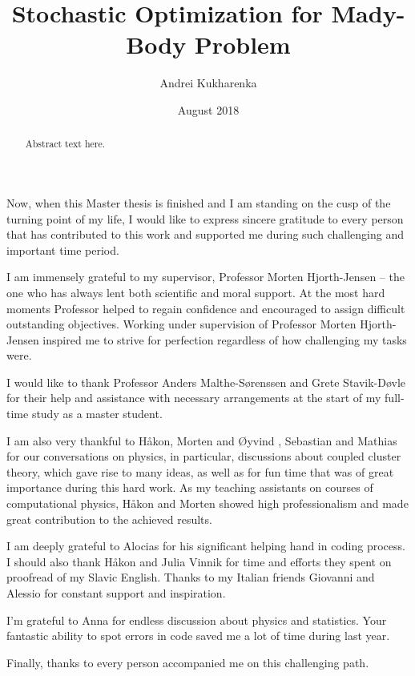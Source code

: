 \documentclass[twoside,english]{uiofysmaster}
\author{Andrei Kukharenka}
\title{Stochastic Optimization for Mady-Body Problem}
\date{August 2018}
\begin{document}
	
	\maketitle
	
	\begin{abstract}
		Abstract text here.
	\end{abstract}
	
	
	\begin{acknowledgements}
		Now, when this Master thesis is finished and I am standing on the cusp of the turning point of my life, I would like to express sincere gratitude to every person that has contributed to this work and supported me during such challenging and important time period.
		
		I am immensely grateful to my supervisor, Professor Morten Hjorth-Jensen -- the one who has always lent both scientific and moral support. At the most hard moments Professor helped to regain confidence and encouraged to assign difficult outstanding objectives. Working under supervision of Professor Morten Hjorth-Jensen inspired me to strive for perfection regardless of how challenging my tasks were.
		
		I would like to thank Professor Anders Malthe-S\o renssen and Grete Stavik-D\o vle for their help and assistance with necessary arrangements at the start of my full-time study as a master student.
		
		I am also very thankful to H\aa kon, Morten and \O yvind , Sebastian and Mathias for our conversations on physics, in particular, discussions about coupled cluster theory, which gave rise to many ideas, as well as for fun time that was of great importance during this hard work. As my teaching assistants on courses of computational physics, H\aa kon and Morten showed high professionalism and made great contribution to the achieved results.
		
		I am deeply grateful to Alocias for his significant helping hand in coding process. I should also thank H\aa kon and Julia Vinnik for time and efforts they spent on proofread of my Slavic English. Thanks to my Italian friends Giovanni and Alessio for constant support and inspiration.
		
		I'm grateful to Anna for endless discussion about physics and statistics. Your fantastic ability to spot errors in code saved me a lot of time during last year.
		
		Finally, thanks to every person accompanied me on this challenging path.
	\end{acknowledgements}
	
\end{document}
